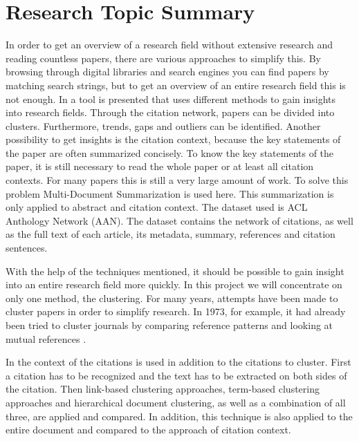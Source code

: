 \section{Research Topic Summary}
In order to get an overview of a research field without extensive research and reading countless papers, there are various approaches to simplify this. By browsing through digital libraries and search engines you can find papers by matching search strings, but to get an overview of an entire research field this is not enough.
In \cite{Rapid_understanding_of_scientific_paper_collections} a tool is presented that uses different methods to gain insights into research fields.
Through the citation network, papers can be divided into clusters. Furthermore, trends, gaps and outliers can be identified.
Another possibility to get insights is the citation context, because the key statements of the paper are often summarized concisely.  To know the key statements of the paper, it is still necessary to read the whole paper or at least all citation contexts. For many papers this is still a very large amount of work. To solve this problem Multi-Document Summarization is used here. This summarization is only applied to abstract and citation context. The dataset used is ACL Anthology Network (AAN).\cite{aan} The dataset contains the network of citations, as well as the full text of each article, its metadata, summary, references and citation sentences. 

With the help of the techniques mentioned, it should be possible to gain insight into an entire research field more quickly.
In this project we will concentrate on only one method, the clustering.
For many years, attempts have been made to cluster papers in order to simplify research. In 1973, for example, it had already been tried to cluster journals by comparing reference patterns and looking at mutual references \cite{Clustering_of_scientific_journals}.

In \cite{Document_clustering_of_scientific_texts_using_citation_contexts} the context of the citations is used in addition to the citations to cluster.
First a citation has to be recognized and the text has to be extracted on both sides of the citation. Then link-based clustering approaches, term-based clustering approaches and hierarchical document clustering, as well as a combination of all three, are applied and compared. In addition, this technique is also applied to the entire document and compared to the approach of citation context.

